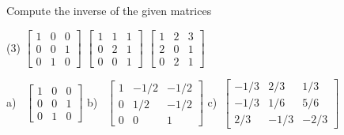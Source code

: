\begin{exercise}
Compute the inverse of the given matrices
\begin{tasks}(3)
\task
$\begin{bmatrix}
1 & 0 & 0 \\
0 & 0 & 1 \\
0 & 1 & 0
\end{bmatrix}$
\task
$\begin{bmatrix}
1 & 1 & 1 \\
0 & 2 & 1 \\
0 & 0 & 1
\end{bmatrix}$
\task
$\begin{bmatrix}
1 & 2 & 3 \\
2 & 0 & 1 \\
0 & 2 & 1
\end{bmatrix}$
\end{tasks}
\end{exercise}
\comboSol{%
}
{%
a)~ $\left[\begin{smallmatrix} 1 & 0 & 0 \\ 0 & 0 & 1 \\ 0 & 1 & 0 \end{smallmatrix}\right]$ \quad b)~ $\left[\begin{smallmatrix} 1 & -1/2 & -1/2 \\ 0 & 1/2 & -1/2 \\ 0 & 0 & 1 \end{smallmatrix}\right]$ \quad c)~$\left[\begin{smallmatrix} -1/3 & 2/3 & 1/3 \\ -1/3 & 1/6 & 5/6 \\ 2/3 & -1/3 & -2/3 \end{smallmatrix}\right]$
}

